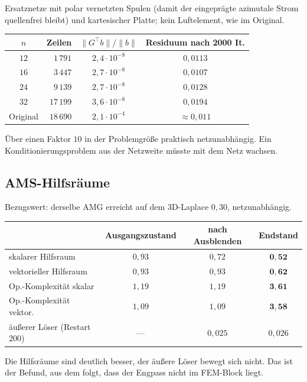 \documentclass[11pt,a4paper]{article}
\begin{document}
Ersatznetze mit polar vernetzten Spulen (damit der eingeprägte azimutale Strom
quellenfrei bleibt) und kartesischer Platte; kein Luftelement, wie im Original.

\begin{center}
\begin{tabular}{crcc}
\toprule
$n$ & Zeilen & $\|G^{\!\top}b\|/\|b\|$ & Residuum nach 2000 It. \\
\midrule
$12$ & $1\,791$  & $2{,}4\cdot10^{-8}$ & $0{,}0113$ \\
$16$ & $3\,447$  & $2{,}7\cdot10^{-8}$ & $0{,}0107$ \\
$24$ & $9\,139$  & $2{,}7\cdot10^{-8}$ & $0{,}0128$ \\
$32$ & $17\,199$ & $3{,}6\cdot10^{-8}$ & $0{,}0194$ \\
\midrule
Original & $18\,690$ & $2{,}1\cdot10^{-4}$ & $\approx0{,}011$ \\
\bottomrule
\end{tabular}
\end{center}

\noindent
Über einen Faktor $10$ in der Problemgröße praktisch netzunabhängig. Ein
Konditionierungsproblem aus der Netzweite müsste mit dem Netz wachsen.

\subsection{AMS-Hilfsräume}

Bezugswert: derselbe AMG erreicht auf dem 3D-Laplace $0{,}30$, netzunabhängig.

\begin{center}
\begin{tabular}{lccc}
\toprule
 & Ausgangszustand & nach Ausblenden & Endstand \\
\midrule
skalarer Hilfsraum      & $0{,}93$ & $0{,}72$ & $\mathbf{0{,}52}$ \\
vektorieller Hilfsraum  & $0{,}93$ & $0{,}93$ & $\mathbf{0{,}62}$ \\
Op.-Komplexität skalar  & $1{,}19$ & $1{,}19$ & $\mathbf{3{,}61}$ \\
Op.-Komplexität vektor. & $1{,}09$ & $1{,}09$ & $\mathbf{3{,}58}$ \\
\midrule
äußerer Löser (Restart 200) & --- & $0{,}025$ & $0{,}026$ \\
\bottomrule
\end{tabular}
\end{center}

\noindent
Die Hilfsräume sind deutlich besser, der äußere Löser bewegt sich nicht. Das
ist der Befund, aus dem folgt, dass der Engpass nicht im FEM-Block liegt.
\end{document}
